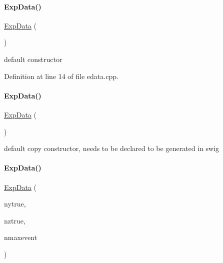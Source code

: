 \paragraph{\texorpdfstring{Exp\+Data()}{ExpData()}\hspace{0.1cm}{\footnotesize\ttfamily [1/8]}}
{\footnotesize\ttfamily \mbox{\hyperlink{classamici_1_1_exp_data}{Exp\+Data}} (\begin{DoxyParamCaption}{ }\end{DoxyParamCaption})}

default constructor 

Definition at line 14 of file edata.\+cpp.

\mbox{\label{classamici_1_1_exp_data_a74a4a08956d260ee4a1b8f701564496d}} 
\paragraph{\texorpdfstring{Exp\+Data()}{ExpData()}\hspace{0.1cm}{\footnotesize\ttfamily [2/8]}}
{\footnotesize\ttfamily \mbox{\hyperlink{classamici_1_1_exp_data}{Exp\+Data}} (\begin{DoxyParamCaption}\item[{const \mbox{\hyperlink{classamici_1_1_exp_data}{Exp\+Data}} \&}]{ }\end{DoxyParamCaption})\hspace{0.3cm}{\ttfamily [default]}}

default copy constructor, needs to be declared to be generated in swig \mbox{\label{classamici_1_1_exp_data_af2322d528ad31a4335b0e5178b373649}} 
\paragraph{\texorpdfstring{Exp\+Data()}{ExpData()}\hspace{0.1cm}{\footnotesize\ttfamily [3/8]}}
{\footnotesize\ttfamily \mbox{\hyperlink{classamici_1_1_exp_data}{Exp\+Data}} (\begin{DoxyParamCaption}\item[{int}]{nytrue,  }\item[{int}]{nztrue,  }\item[{int}]{nmaxevent }\end{DoxyParamCaption})}

